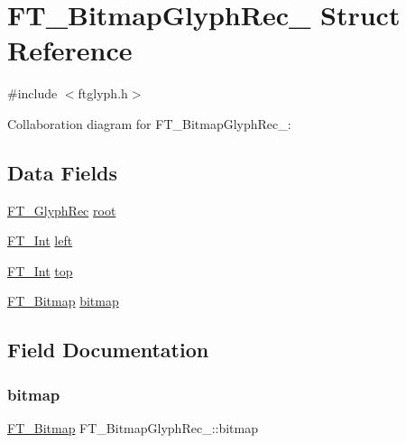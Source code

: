 \hypertarget{struct_f_t___bitmap_glyph_rec__}{}\section{F\+T\+\_\+\+Bitmap\+Glyph\+Rec\+\_\+ Struct Reference}
\label{struct_f_t___bitmap_glyph_rec__}


{\ttfamily \#include $<$ftglyph.\+h$>$}



Collaboration diagram for F\+T\+\_\+\+Bitmap\+Glyph\+Rec\+\_\+\+:
\subsection*{Data Fields}
\begin{DoxyCompactItemize}
\item 
\hyperlink{ftglyph_8h_a095b515f46c978b33ffc9c20aad081a4}{F\+T\+\_\+\+Glyph\+Rec} \hyperlink{struct_f_t___bitmap_glyph_rec___ac3970353fbc0fe3d4c59c3fd608140f3}{root}
\item 
\hyperlink{fttypes_8h_af90e5fb0d07e21be9fe6faa33f02484c}{F\+T\+\_\+\+Int} \hyperlink{struct_f_t___bitmap_glyph_rec___a6cfd2d89af7b6be4af886047c9cb7e0a}{left}
\item 
\hyperlink{fttypes_8h_af90e5fb0d07e21be9fe6faa33f02484c}{F\+T\+\_\+\+Int} \hyperlink{struct_f_t___bitmap_glyph_rec___a25fc81296678d6a2d064843c01bc05f7}{top}
\item 
\hyperlink{ftimage_8h_ae28691030f2d16376937cf5e3485f921}{F\+T\+\_\+\+Bitmap} \hyperlink{struct_f_t___bitmap_glyph_rec___a16ecd0725920f8d5ad4c14e9448126ad}{bitmap}
\end{DoxyCompactItemize}


\subsection{Field Documentation}
\mbox{\label{struct_f_t___bitmap_glyph_rec___a16ecd0725920f8d5ad4c14e9448126ad}} 
\subsubsection{\texorpdfstring{bitmap}{bitmap}}
{\footnotesize\ttfamily \hyperlink{ftimage_8h_ae28691030f2d16376937cf5e3485f921}{F\+T\+\_\+\+Bitmap} F\+T\+\_\+\+Bitmap\+Glyph\+Rec\+\_\+\+::bitmap}

